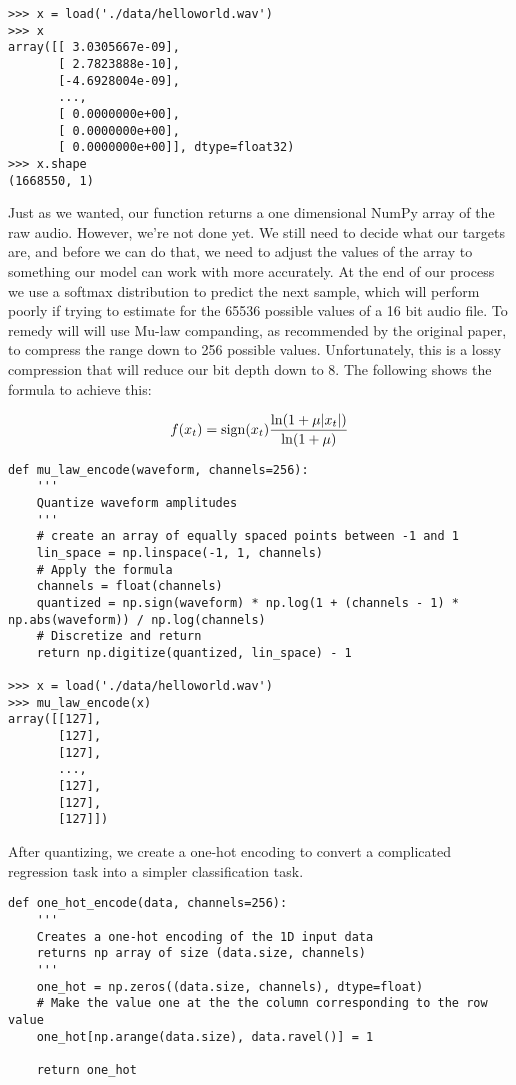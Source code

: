 \begin{verbatim}
>>> x = load('./data/helloworld.wav')
>>> x
array([[ 3.0305667e-09],
       [ 2.7823888e-10],
       [-4.6928004e-09],
       ...,
       [ 0.0000000e+00],
       [ 0.0000000e+00],
       [ 0.0000000e+00]], dtype=float32)
>>> x.shape
(1668550, 1)
\end{verbatim}

Just as we wanted, our function returns a one dimensional NumPy array of the raw audio. However, we're not done yet. We still need to decide what our targets are, and before we can do that, we need to adjust the values of the array to something our model can work with more accurately. At the end of our process we use a softmax distribution to predict the next sample, which will perform poorly if trying to estimate for the 65536 possible values of a 16 bit audio file. To remedy will will use Mu-law companding, as recommended by the original paper, to compress the range down to 256 possible values. Unfortunately, this is a lossy compression that will reduce our bit depth down to 8. The following shows the formula to achieve this:

\[f(x_t)=\operatorname{sign}(x_t)\frac{\ln(1+\mu|x_t|)}{\ln(1+\mu)}\]

\newpage 

\begin{verbatim}
def mu_law_encode(waveform, channels=256):
    '''
    Quantize waveform amplitudes
    '''
    # create an array of equally spaced points between -1 and 1
    lin_space = np.linspace(-1, 1, channels)
    # Apply the formula
    channels = float(channels)
    quantized = np.sign(waveform) * np.log(1 + (channels - 1) * np.abs(waveform)) / np.log(channels)
    # Discretize and return
    return np.digitize(quantized, lin_space) - 1
    
>>> x = load('./data/helloworld.wav')
>>> mu_law_encode(x)
array([[127],
       [127],
       [127],
       ...,
       [127],
       [127],
       [127]])
\end{verbatim}

After quantizing, we create a one-hot encoding to convert a complicated regression task into a simpler classification task.

\begin{verbatim}
def one_hot_encode(data, channels=256):
    '''
    Creates a one-hot encoding of the 1D input data
    returns np array of size (data.size, channels)
    '''
    one_hot = np.zeros((data.size, channels), dtype=float)
    # Make the value one at the the column corresponding to the row value
    one_hot[np.arange(data.size), data.ravel()] = 1

    return one_hot
\end{verbatim}

